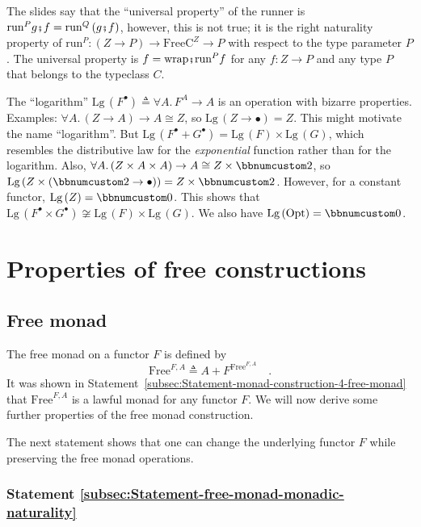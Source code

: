 The slides say that the \textsf{``}universal property\textsf{''} of the runner is
$\text{run}^{P}g\bef f=\text{run}^{Q}\left(g\bef f\right)$, however,
this is not true; it is the right naturality property of $\text{run}^{P}:\left(Z\rightarrow P\right)\rightarrow\text{FreeC}^{Z}\rightarrow P$
with respect to the type parameter $P$. The universal property is
$f=\text{wrap}\bef\text{run}^{P}f$ for any $f:Z\rightarrow P$ and
any type $P$ that belongs to the typeclass $C$.

The \textsf{``}logarithm\textsf{''} $\text{Lg}\,(F^{\bullet})\triangleq\forall A.\,F^{A}\rightarrow A$
is an operation with bizarre properties. Examples: $\forall A.\,\left(Z\rightarrow A\right)\rightarrow A\cong Z$,
so $\text{Lg}\,(Z\rightarrow\bullet)=Z$. This might motivate the
name \textsf{``}logarithm\textsf{''}. But $\text{Lg}\,(F^{\bullet}+G^{\bullet})=\text{Lg}\,(F)\times\text{Lg}\,(G)$,
which resembles the distributive law for the \emph{exponential} function
rather than for the logarithm. Also, $\forall A.\,(Z\times A\times A)\rightarrow A\cong Z\times\bbnum 2$,
so $\text{Lg}\,(Z\times(\bbnum 2\rightarrow\bullet))=Z\times\bbnum 2$.
However, for a constant functor, $\text{Lg}\,(Z)=\bbnum 0$. This
shows that $\text{Lg}\,(F^{\bullet}\times G^{\bullet})\not\cong\text{Lg}\,(F)\times\text{Lg}\,(G)$.
We also have $\text{Lg}\,(\text{Opt})=\bbnum 0$.

\section{Properties of free constructions}

\subsection{Free monad}

The free monad on a functor $F$ is defined by
\[
\text{Free}^{F,A}\triangleq A+F^{\text{Free}^{F,A}}\quad.
\]
It was shown in Statement~\ref{subsec:Statement-monad-construction-4-free-monad}
that $\text{Free}^{F,A}$ is a lawful monad for any functor $F$.
We will now derive some further properties of the free monad construction.

The next statement shows that one can change the underlying functor
$F$ while preserving the free monad operations.

\subsubsection{Statement \label{subsec:Statement-free-monad-monadic-naturality}\ref{subsec:Statement-free-monad-monadic-naturality}}

